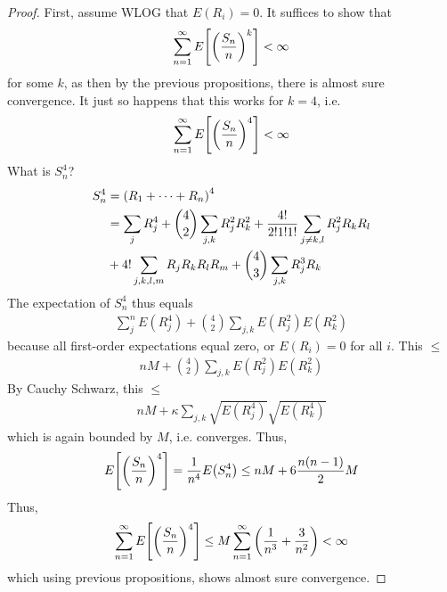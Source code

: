 \begin{proof}
    First, assume WLOG that $E(R_i) = 0$. It suffices to show that
    \begin{align}
        \sum_{n=1}^\infty E\qty[\qty(\frac{S_n}{n})^k] < \infty
    \end{align}
    for some $k$, as then by the previous propositions, there is almost sure convergence. It just so happens that this works for $k = 4$, i.e.
    \begin{align}
        \sum_{n=1}^\infty E\qty[\qty(\frac{S_n}{n})^4] < \infty
    \end{align}
    What is $S_n^4$?
    \begin{align}
        S_n^4 &= \qty(R_1 + \cdots + R_n)^4\\
        &= \sum_{j} R_j^4 + \binom{4}{2} \sum_{j,k} R_j^2 R_k^2 + \frac{4!}{2!1!1!} \sum_{j \ne k,l} R_j^2 R_k R_l\\
        &+ 4! \sum_{j,k,l,m} R_jR_kR_lR_m + \binom{4}{3} \sum_{j,k} R_j^3 R_k
    \end{align}
    The expectation of $S_n^4$ thus equals
    \begin{align}
        \sum_{j}^n E(R_j^4) + \binom{4}{2} \sum_{j,k} E(R_j^2) E(R_k^2)
    \end{align}
    because all first-order expectations equal zero, or $E(R_i) = 0$ for all $i$. This $\le$
    \begin{align}
        nM + \binom{4}{2} \sum_{j,k} E(R_j^2) E(R_k^2)
    \end{align}
    By Cauchy Schwarz, this $\le$
    \begin{align}
        nM + \kappa \sum_{j,k} \sqrt{E(R_j^4)} \sqrt{E(R_k^4)}
    \end{align}
    which is again bounded by $M$, i.e. converges. Thus,
    \begin{align}
        E\qty[\qty(\frac{S_n}{n})^4] = \frac{1}{n^4} E\qty(S_n^4) \le nM + 6\frac{n(n-1)}{2}M
    \end{align}
    Thus,
    \begin{align}
        \sum_{n=1}^\infty E\qty[\qty(\frac{S_n}{n})^4] \le M \sum_{n=1}^\infty \qty(\frac{1}{n^3} + \frac{3}{n^2}) < \infty
    \end{align}
    which using previous propositions, shows almost sure convergence.
\end{proof}

